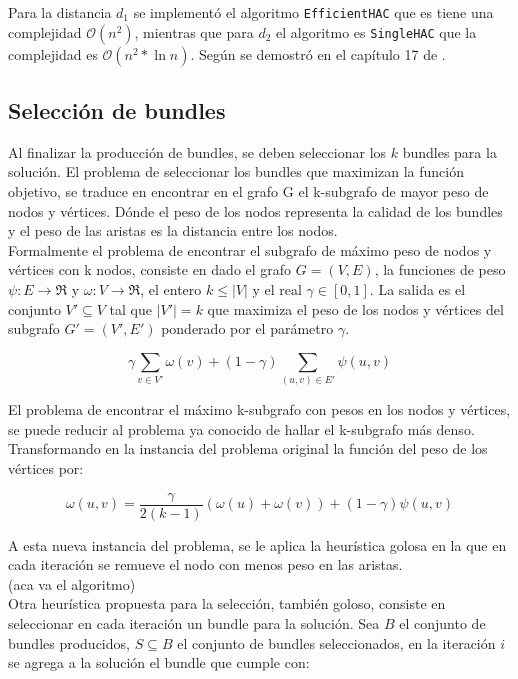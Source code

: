 Para la distancia $d_{1}$ se implementó el algoritmo \texttt{EfficientHAC} que es tiene una complejidad $\mathcal{O}(n^{2})$, mientras que para $d_{2}$ el algoritmo es \texttt{SingleHAC} que la complejidad es $\mathcal{O}(n^{2} * \ln{n})$. Según se demostró en el capítulo 17 de \cite{informationRetrival}.


\subsection{Selección de bundles}
Al finalizar la producción de bundles, se deben seleccionar los $k$ bundles para la solución. El problema de seleccionar los bundles que maximizan la función objetivo, se traduce en encontrar en el grafo G el k-subgrafo de mayor peso de nodos y vértices. Dónde el peso de los nodos representa la calidad de los bundles y el peso de las aristas es la distancia entre los nodos.\\
Formalmente el problema de encontrar el subgrafo de máximo peso de nodos y vértices con k nodos, consiste en dado el grafo $ G = (V,E) $, la funciones de peso $\psi : E \rightarrow \Re$ y $\omega : V \rightarrow \Re$, el entero $ k \leq |V| $ y el real $\gamma \in [0,1]$. La salida es el conjunto $V' \subseteq V$ tal que $|V'| = k$ que maximiza el peso de los nodos y vértices del subgrafo $G' = (V', E')$ ponderado por el parámetro $\gamma$.

\begin{equation}
\gamma \sum_{v \in V'}{\omega(v)} + (1 - \gamma) \sum_{(u,v) \in E'}{\psi(u,v)}
\end{equation}

El problema de encontrar el máximo k-subgrafo con pesos en los nodos y vértices, se puede reducir al problema ya conocido de hallar el k-subgrafo más denso\cite{SubgraphProblem}. Transformando en la instancia del problema original la función del peso de los vértices por:
 
\begin{equation}
\omega(u,v) = \dfrac{\gamma}{2( k - 1)} (\omega(u) + \omega(v)) + (1 - \gamma)\psi(u,v) 
\end{equation}

A esta nueva instancia del problema, se le aplica la heurística golosa en la que en cada iteración se remueve el nodo con menos peso en las aristas.\\

(aca va el algoritmo)\\

Otra heurística propuesta para la selección, también goloso, consiste en seleccionar en cada iteración un bundle para la solución. Sea $B$ el conjunto de bundles producidos, $S \subseteq B$ el conjunto de bundles seleccionados, en la iteración $i$ se agrega a la solución el bundle que cumple con:


